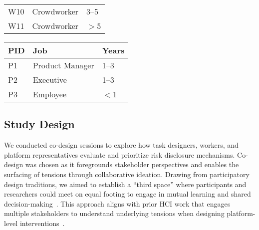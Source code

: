 \begin{table*}
\begin{minipage}[b]{0.32\textwidth}
\begin{tabular}{lll}
W10 & Crowdworker & 3--5 \\
W11 & Crowdworker & $>$5 \\
\bottomrule
\end{tabular}
\caption{Worker Participants}
\end{minipage}
\hfill
\begin{minipage}[b]{0.32\textwidth}
\centering
\begin{tabular}{lll}
\toprule
\textbf{PID} & \textbf{Job} & \textbf{Years} \\
\midrule
P1 & Product Manager & 1--3 \\
P2 & Executive & 1--3 \\
P3 & Employee & $<$1 \\
\bottomrule
\end{tabular}
\caption{Platform Representatives}
\end{minipage}
\end{table*}











\subsection{Study Design}
We conducted co-design sessions to explore how task designers, workers, and platform representatives evaluate and prioritize risk disclosure mechanisms. Co-design was chosen as it foregrounds stakeholder perspectives and enables the surfacing of tensions through collaborative ideation. Drawing from participatory design traditions, we aimed to establish a ``third space'' where participants and researchers could meet on equal footing to engage in mutual learning and shared decision-making~\cite{muller_participatory_nodate, steen2013co, bodker_participatory_2018}. This approach aligns with prior HCI work that engages multiple stakeholders to understand underlying tensions when designing platform-level interventions~\cite{hsieh_designing_2023, tang2024ai}.

